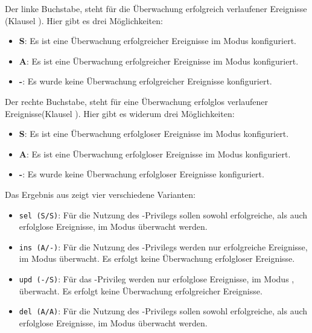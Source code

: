         Der linke Buchstabe, steht für die Überwachung erfolgreich verlaufener Ereignisse (Klausel ). Hier gibt es drei Möglichkeiten:
        \begin{itemize}
          \item \textbf{S}: Es ist eine Überwachung erfolgreicher Ereignisse im Modus  konfiguriert.
          \item \textbf{A}: Es ist eine Überwachung erfolgreicher Ereignisse im Modus  konfiguriert.
          \item \textbf{-}: Es wurde keine Überwachung erfolgreicher Ereignisse konfiguriert.
        \end{itemize}
        Der rechte Buchstabe, steht für eine Überwachung erfolglos verlaufener Ereignisse(Klausel ). Hier gibt es widerum drei Möglichkeiten:
        \begin{itemize}
          \item \textbf{S}: Es ist eine Überwachung erfolgloser Ereignisse im Modus  konfiguriert.
          \item \textbf{A}: Es ist eine Überwachung erfolgloser Ereignisse im Modus  konfiguriert.
          \item \textbf{-}: Es wurde keine Überwachung erfolgloser Ereignisse konfiguriert.
        \end{itemize}
        Das Ergebnis aus  zeigt vier verschiedene Varianten:
        \begin{itemize}
          \item \texttt{sel (S/S)}: Für die Nutzung des -Privilegs sollen sowohl erfolgreiche, als auch erfolglose Ereignisse, im Modus  überwacht werden.
          \item \texttt{ins (A/-)}: Für die Nutzung des -Privilegs werden nur erfolgreiche Ereignisse, im Modus  überwacht. Es erfolgt keine Überwachung erfolgloser Ereignisse.
          \item \texttt{upd (-/S)}: Für das -Privileg werden nur erfolglose Ereignisse, im Modus , überwacht. Es erfolgt keine Überwachung erfolgreicher Ereignisse.
          \item \texttt{del (A/A)}: Für die Nutzung des -Privilegs sollen sowohl erfolgreiche, als auch erfolglose Ereignisse, im Modus  überwacht werden.
        \end{itemize}
